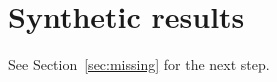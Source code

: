 \documentclass{article}
\begin{document}
\section{Synthetic results}
\label{sec:synthetic-results}

See Section~\ref{sec:missing} for the next step.
\end{document}
